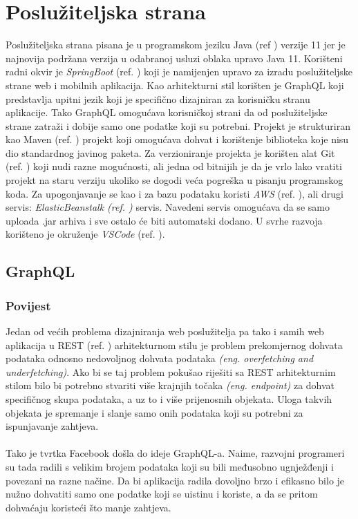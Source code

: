 \documentclass[times, utf8, zavrsni]{fer}
\begin{document}
\section{Poslužiteljska strana}
Poslužiteljska strana pisana je u programskom jeziku Java (ref \cite{ProgramiranjeUJavi}) verzije 11 jer je najnovija podržana verzija
u odabranoj usluzi oblaka upravo Java 11. Korišteni radni okvir je
\textit{SpringBoot} (ref. \cite{GraphQL}) koji je namijenjen upravo za izradu poslužiteljske strane web i mobilnih aplikacija.
Kao arhitekturni stil korišten je GraphQL koji predstavlja upitni jezik koji je specifično dizajniran za korisničku stranu aplikacije.
Tako GraphQL omogućava korisničkoj strani da od poslužiteljske strane zatraži i dobije samo one podatke koji su potrebni.
Projekt je strukturiran kao Maven (ref. \cite{maven}) projekt koji omogućava dohvat i korištenje biblioteka koje nisu
dio standardnog javinog paketa.
Za verzioniranje projekta je korišten alat Git (ref. \cite{git}) koji nudi razne mogućnosti, ali jedna od
bitnijih je da je vrlo lako vratiti projekt na staru verziju
ukoliko se dogodi veća pogreška u pisanju programskog koda. Za upogonjavanje
se kao i za bazu podataku koristi \textit{AWS} (ref. \cite{AWS}), ali drugi servis: \textit{ElasticBeanstalk (ref. \cite{EB})} servis.
Navedeni servis omogućava da se samo uploada .jar arhiva i sve ostalo će biti
automatski dodano.
U svrhe razvoja korišteno je okruženje \textit{VSCode} (ref. \cite{vsc}).

\subsection{GraphQL}

\subsubsection{Povijest}
Jedan od većih problema dizajniranja web poslužitelja pa tako i samih web aplikacija u REST (ref. \cite{REST})
arhitekturnom stilu je problem prekomjernog dohvata podataka odnosno nedovoljnog dohvata podataka
\textit{(eng. overfetching and underfetching)}. Ako bi se taj problem pokušao riješiti sa REST
arhitekturnim stilom bilo bi potrebno stvariti više krajnjih točaka \textit{(eng. endpoint)} za dohvat specifičnog skupa podataka,
a uz to i više prijenosnih objekata.
Uloga takvih objekata je spremanje i slanje samo onih podataka koji su potrebni za ispunjavanje zahtjeva.
\\\\
Tako je tvrtka Facebook došla
do ideje GraphQL-a. Naime, razvojni programeri su tada radili s velikim brojem podataka koji su
bili međusobno ugnježđenji i povezani na razne načine. Da bi aplikacija radila dovoljno brzo
i efikasno bilo je nužno dohvatiti samo one podatke koji se uistinu i koriste, a da se pritom dohvaćaju koristeći
što manje zahtjeva.
\end{document}
